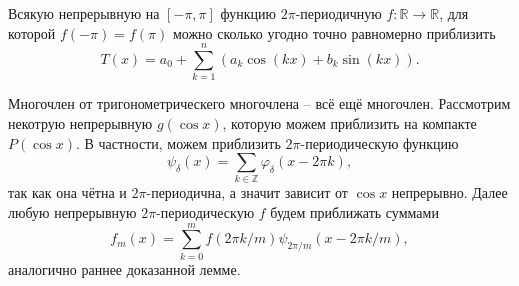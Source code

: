 
\begin{to_thr}
    Всякую непрерывную
    на $[-\pi, \pi]$ функцию $2\pi$-периодичную $f \colon \mathbb{R} \to \mathbb{R}$, для которой $f(-\pi)=f(\pi)$
       можно сколько угодно точно равномерно приблизить $$T(x) = a_0 + \sum\limits_{k = 1}^{n}(a_k \cos(k x) + b_k \sin(k x)). $$
\label{Vthr}
\end{to_thr}


\begin{uproof}
    Многочлен от тригонометрическего многочлена -- всё ещё многочлен. Рассмотрим некотрую непрерывную $g(\cos x)$, которую можем приблизить на компакте $P(\cos x)$. В частности, можем приблизить $2 \pi$-периодическую функцию 
    \begin{equation*}
        \psi_\delta(x) = \sum_{k \in \mathbb{Z}} \varphi_\delta (x-  2 \pi k),
    \end{equation*}
    так как она чётна и $2\pi$-периодична, а значит зависит от $\cos x$ непрерывно. Далее любую непрерывную $2\pi$-периодическую $f$ будем приближать суммами
    \begin{equation*}
        f_m (x) = \sum_{k=0}^{m} f( 2 \pi k /m) \psi_{2 \pi /m} (x-2\pi k /m),
    \end{equation*}
    аналогично раннее доказанной лемме. 
\end{uproof}